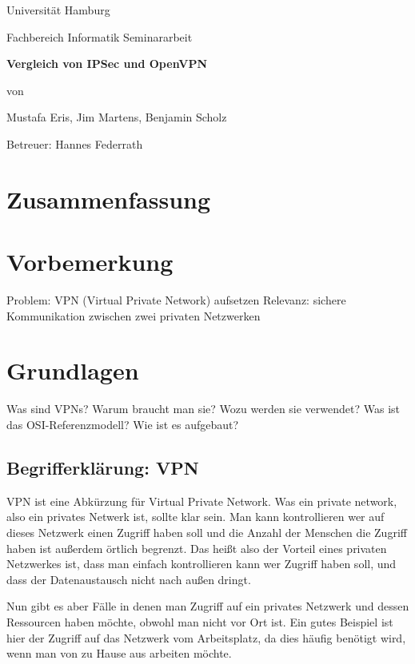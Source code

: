 \documentclass[12pt]{scrartcl}
\begin{document}
\newpage
\thispagestyle{empty}
\begin{center}\Large
Universität Hamburg \par
Fachbereich Informatik
\vfill
Seminararbeit
\vfill
{\Large\textsf{\textbf{Vergleich von IPSec und OpenVPN}}\par}
\vfill
von 
\par\bigskip
Mustafa Eris, Jim Martens, Benjamin Scholz \par
Betreuer: Hannes Federrath \par
\end{center}

\newpage
\section*{Zusammenfassung}


\newpage
\tableofcontents

\newpage
\section{Vorbemerkung}
Problem: VPN (Virtual Private Network) aufsetzen
Relevanz: sichere Kommunikation zwischen zwei privaten Netzwerken
\section{Grundlagen}
Was sind VPNs? Warum braucht man sie? Wozu werden sie verwendet?
Was ist das OSI-Referenzmodell? Wie ist es aufgebaut?
\subsection{Begrifferklärung: VPN}
VPN ist eine Abkürzung für Virtual Private Network. Was ein private network, also ein privates Netwerk ist, sollte klar sein. Man kann kontrollieren wer auf dieses Netzwerk einen Zugriff haben soll und die Anzahl der Menschen die Zugriff haben ist außerdem örtlich begrenzt. Das heißt also der Vorteil eines privaten Netzwerkes ist, dass man einfach kontrollieren kann wer Zugriff haben soll, und dass der Datenaustausch nicht nach außen dringt.

Nun gibt es aber Fälle in denen man Zugriff auf ein privates Netzwerk und dessen Ressourcen haben möchte, obwohl man nicht vor Ort ist. Ein gutes Beispiel ist hier der Zugriff auf das Netzwerk vom Arbeitsplatz, da dies häufig benötigt wird, wenn man von zu Hause aus arbeiten möchte.
\end{document}
